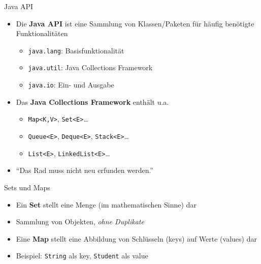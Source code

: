 \documentclass[18pt]{beamer}
\newcommand{\quotes}[1]{``#1''}
\begin{document}
\begin{frame}{Java API}
    \begin{itemize}
        \item Die \textbf{Java API} ist eine Sammlung von Klassen/Paketen für häufig benötigte Funktionalitäten

        \begin{itemize}
            \item \texttt{java.lang}: Basisfunktionalität
            \item \texttt{java.util}: Java Collections Framework
            \item \texttt{java.io}: Ein- und Ausgabe
        \end{itemize}

        \vspace{.2in}

        \item Das \textbf{Java Collections Framework} enthält u.a.
        \begin{itemize}
            \item \texttt{Map<K,V>}, \texttt{Set<E>}\dots
            \item \texttt{Queue<E>}, \texttt{Deque<E>}, \texttt{Stack<E>}\dots
            \item \texttt{List<E>}, \texttt{LinkedList<E>}\dots
        \end{itemize}

        \vspace{.2in}

        \item \quotes{Das Rad muss nicht neu erfunden werden.}

    \end{itemize}
\end{frame}

\begin{frame}{Sets und Maps}
    \begin{block}{}
        \begin{itemize}
            \item Ein \textbf{Set} stellt eine Menge (im mathematischen Sinne) dar
            \item Sammlung von Objekten, \textit{ohne Duplikate}
        \end{itemize}
    \end{block}

    \begin{block}{}
        \begin{itemize}
            \item Eine \textbf{Map} stellt eine Abbildung von Schlüsseln (keys) auf Werte (values) dar
            \item Beispiel: \texttt{String} als key, \texttt{Student} als value
        \end{itemize}

    \end{block}
\end{frame}
\end{document}
